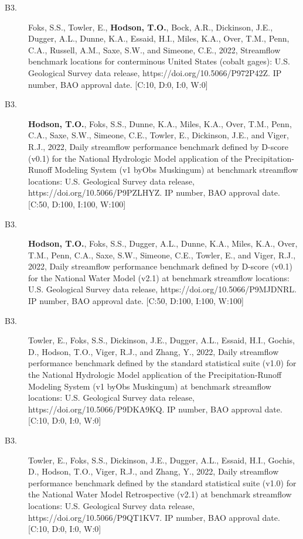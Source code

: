 \documentclass[12pt]{article}
\makeatletter
\def\namedlabel#1#2{\begingroup
	\def\@currentlabel{#2}%
	\label{#1}\endgroup
}
\makeatother
\begin{document}
\begin{description}
    \item[B3.\namedlabel{benchmark_2021}{B3}]
    Foks, S.S., Towler, E., \textbf{Hodson, T.O.}, Bock, A.R., Dickinson, J.E., Dugger, A.L., Dunne, K.A., Essaid, H.I., Miles, K.A., Over, T.M., Penn, C.A., Russell, A.M., Saxe, S.W., and Simeone, C.E.,
    2022, Streamflow benchmark locations for conterminous United States (cobalt gages):
    U.S. Geological Survey data release, https://doi.org/10.5066/P972P42Z.
    IP number, BAO approval date. [C:10, D:0, I:0, W:0]
    
    \item[B3.\namedlabel{benchmark_2021a}{B3}]
    \textbf{Hodson, T.O.}, Foks, S.S., Dunne, K.A., Miles, K.A., Over, T.M., Penn, C.A., Saxe, S.W., Simeone, C.E., Towler, E., Dickinson, J.E., and Viger, R.J.,
    2022, Daily streamflow performance benchmark defined by D-score (v0.1) for the National Hydrologic Model application of the Precipitation-Runoff Modeling System (v1 byObs Muskingum) at benchmark streamflow locations:
    U.S. Geological Survey data release, https://doi.org/10.5066/P9PZLHYZ.
    IP number, BAO approval date. [C:50, D:100, I:100, W:100]
    
    \item[B3.\namedlabel{benchmark_2021b}{B3}] 
    \textbf{Hodson, T.O.}, Foks, S.S., Dugger, A.L., Dunne, K.A., Miles, K.A., Over, T.M., Penn, C.A., Saxe, S.W., Simeone, C.E., Towler, E., and Viger, R.J.,
    2022, Daily streamflow performance benchmark defined by D-score (v0.1) for the National Water Model (v2.1) at benchmark streamflow locations:
    U.S. Geological Survey data release, https://doi.org/10.5066/P9MJDNRL.
    IP number, BAO approval date. [C:50, D:100, I:100, W:100]
    
    \item[B3.\namedlabel{benchmark_2021c}{B3}] 
    Towler, E., Foks, S.S., Dickinson, J.E., Dugger, A.L., Essaid, H.I., Gochis, D., Hodson, T.O., Viger, R.J., and Zhang, Y.,
    2022, Daily streamflow performance benchmark defined by the standard statistical suite (v1.0) for the National Hydrologic Model application of the Precipitation-Runoff Modeling System (v1 byObs Muskingum) at benchmark streamflow locations:
    U.S. Geological Survey data release, https://doi.org/10.5066/P9DKA9KQ.
    IP number, BAO approval date. [C:10, D:0, I:0, W:0]
    
    \item[B3.\namedlabel{benchmark_2021d}{B3}] 
    Towler, E., Foks, S.S., Dickinson, J.E., Dugger, A.L., Essaid, H.I., Gochis, D., Hodson, T.O., Viger, R.J., and Zhang, Y., 2022,
    Daily streamflow performance benchmark defined by the standard statistical suite (v1.0) for the National Water Model Retrospective (v2.1) at benchmark streamflow locations:
    U.S. Geological Survey data release, https://doi.org/10.5066/P9QT1KV7.
    IP number, BAO approval date. [C:10, D:0, I:0, W:0]
    

\end{description}
\end{document}
